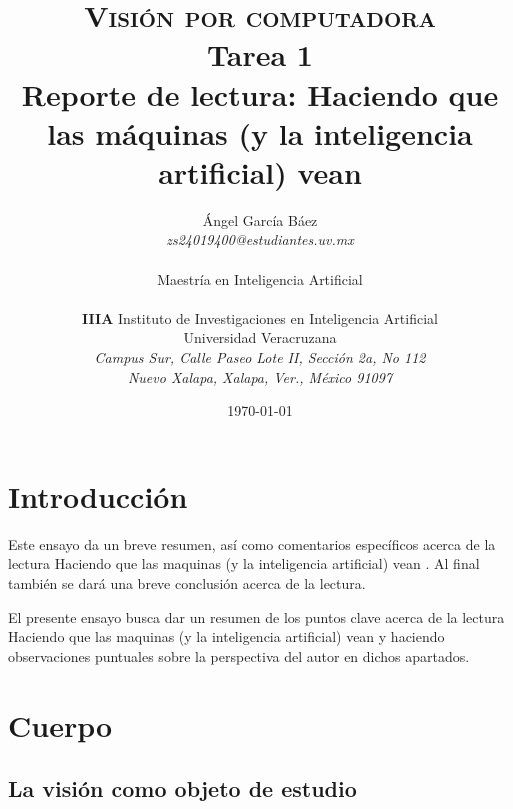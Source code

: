 \documentclass[11pt, letterpaper]{article}
\title{\textsc{Visión por computadora} \\
  Tarea 1\\
  Reporte de lectura: Haciendo que las máquinas (y la inteligencia artificial) vean}
\author{Ángel García Báez \\ \emph{zs24019400@estudiantes.uv.mx} \\ \\
  Maestría en Inteligencia Artificial \\ \\ \textbf{IIIA}
  Instituto de Investigaciones en Inteligencia Artificial \\
  Universidad Veracruzana \\ \emph{Campus Sur, Calle Paseo Lote II,
    Sección 2a, No 112} \\ \emph{Nuevo Xalapa, Xalapa, Ver., México 91097}}
\date{\today}
\begin{document}
\maketitle

\section{Introducción}

Este ensayo da un breve resumen, así como comentarios específicos acerca de la lectura Haciendo que las maquinas (y la inteligencia artificial) vean \cite{hurlbert1988}. Al final también se dará una breve conclusión acerca de la lectura.

El presente ensayo busca dar un resumen de los puntos clave acerca de la lectura Haciendo que las maquinas (y la inteligencia artificial) vean \cite{hurlbert1988} y haciendo observaciones puntuales sobre la perspectiva del autor en dichos apartados.

\section{Cuerpo}

\subsection{La visión como objeto de estudio}
\end{document}
